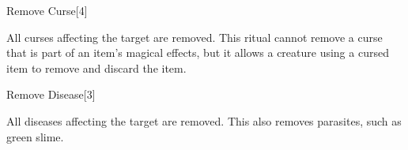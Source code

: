 \begin{spellsection}{Remove Curse}[4]
    \begin{spellheader}
    \end{spellheader}
    \begin{spellcontent}
        \begin{spelltargetinginfo}
        \end{spelltargetinginfo}
        \begin{spelleffects}
            \spelleffect All curses affecting the target are removed. This ritual cannot remove a curse that is part of an item's magical effects, but it allows a creature using a cursed item to remove and discard the item.
        \end{spelleffects}
    \end{spellcontent}
    \begin{spellfooter}
    \end{spellfooter}
\end{spellsection}

\begin{spellsection}{Remove Disease}[3]
    \begin{spellheader}
    \end{spellheader}
    \begin{spellcontent}
        \begin{spelltargetinginfo}
        \end{spelltargetinginfo}
        \begin{spelleffects}
            \spelleffect All diseases affecting the target are removed. This also removes parasites, such as green slime.
        \end{spelleffects}
    \end{spellcontent}
    \begin{spellfooter}
    \end{spellfooter}
\end{spellsection}

